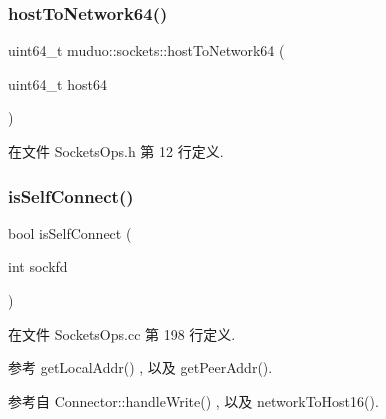 \subsubsection{\texorpdfstring{host\+To\+Network64()}{hostToNetwork64()}}
{\footnotesize\ttfamily uint64\+\_\+t muduo\+::sockets\+::host\+To\+Network64 (\begin{DoxyParamCaption}\item[{uint64\+\_\+t}]{host64 }\end{DoxyParamCaption})\hspace{0.3cm}{\ttfamily [inline]}}



在文件 Sockets\+Ops.\+h 第 12 行定义.

\mbox{\label{namespacemuduo_1_1sockets_ae3b7d08b5cb176e9d67580a0a1fd57fb}} 
\subsubsection{\texorpdfstring{is\+Self\+Connect()}{isSelfConnect()}}
{\footnotesize\ttfamily bool is\+Self\+Connect (\begin{DoxyParamCaption}\item[{int}]{sockfd }\end{DoxyParamCaption})}



在文件 Sockets\+Ops.\+cc 第 198 行定义.



参考 get\+Local\+Addr() , 以及 get\+Peer\+Addr().



参考自 Connector\+::handle\+Write() , 以及 network\+To\+Host16().

